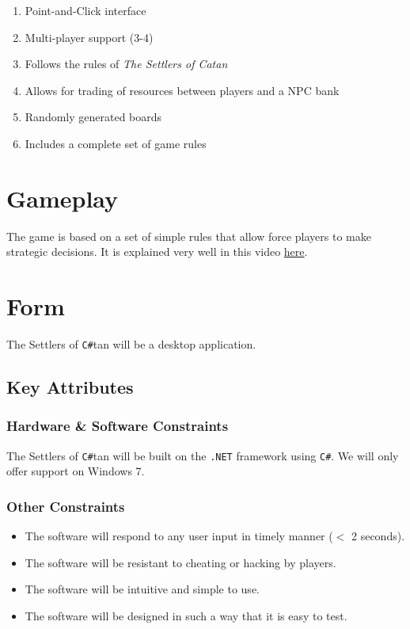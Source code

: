 \documentclass[12pt]{article}
\begin{document}
\begin{enumerate}

\item Point-and-Click interface
\item Multi-player support (3-4)
\item Follows the rules of \emph{The Settlers of Catan}
\item Allows for trading of resources between players and a NPC bank
\item Randomly generated boards
\item Includes a complete set of game rules

\end{enumerate}

\section{Gameplay}
The game is based on a set of simple rules that allow force players to make strategic decisions. It is explained very well in this video \href{http://www.youtube.com/watch?v=FURoYf5IXRA&feature=player_embedded#!}{here}.

\section{Form}
The Settlers of \verb!C#!tan will be a desktop application.

\subsection{Key Attributes}

\subsubsection{Hardware \& Software Constraints}
 The Settlers of \verb!C#!tan will be built on the \verb!.NET! framework using \verb!C#!. We will only offer support on Windows 7.

\subsubsection{Other Constraints}
\begin{itemize}
\item The software will respond to any user input in timely manner ($<$ 2 seconds).
\item The software will be resistant to cheating or hacking by players.
\item The software will be intuitive and simple to use.
\item The software will be designed in such a way that it is easy to test.
\end{itemize}
\end{document}
